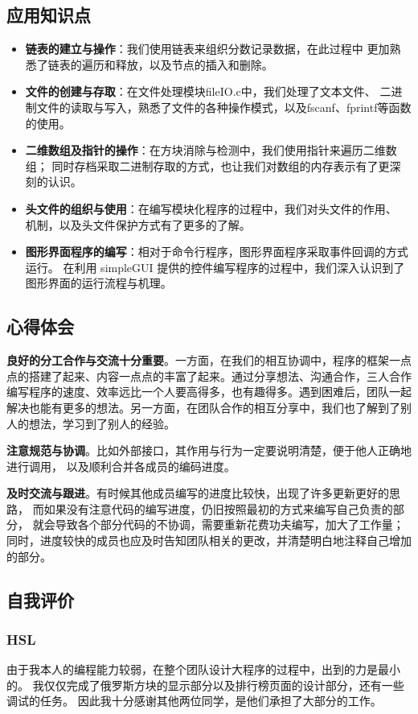 \documentclass{style/ucasproposal}
\begin{document}
\subsection{应用知识点}
\begin{itemize}
    \item \textbf{链表的建立与操作}：我们使用链表来组织分数记录数据，在此过程中
    更加熟悉了链表的遍历和释放，以及节点的插入和删除。
    \item \textbf{文件的创建与存取}：在文件处理模块fileIO.c中，我们处理了文本文件、
    二进制文件的读取与写入，熟悉了文件的各种操作模式，以及fscanf、fprintf等函数的使用。
    \item \textbf{二维数组及指针的操作}：在方块消除与检测中，我们使用指针来遍历二维数组；
    同时存档采取二进制存取的方式，也让我们对数组的内存表示有了更深刻的认识。
    \item \textbf{头文件的组织与使用}：在编写模块化程序的过程中，我们对头文件的作用、
    机制，以及头文件保护方式有了更多的了解。
    \item \textbf{图形界面程序的编写}：相对于命令行程序，图形界面程序采取事件回调的方式运行。
    在利用 simpleGUI 提供的控件编写程序的过程中，我们深入认识到了图形界面的运行流程与机理。
\end{itemize}


\subsection{心得体会}
\textbf{良好的分工合作与交流十分重要}。一方面，在我们的相互协调中，程序的框架一点点的搭建了起来、内容一点点的丰富了起来。通过分享想法、沟通合作，三人合作编写程序的速度、效率远比一个人要高得多，也有趣得多。遇到困难后，团队一起解决也能有更多的想法。另一方面，在团队合作的相互分享中，我们也了解到了别人的想法，学习到了别人的经验。

\textbf{注意规范与协调}。比如外部接口，其作用与行为一定要说明清楚，便于他人正确地进行调用，
以及顺利合并各成员的编码进度。

\textbf{及时交流与跟进}。有时候其他成员编写的进度比较快，出现了许多更新更好的思路，
而如果没有注意代码的编写进度，仍旧按照最初的方式来编写自己负责的部分，
就会导致各个部分代码的不协调，需要重新花费功夫编写，加大了工作量；
同时，进度较快的成员也应及时告知团队相关的更改，并清楚明白地注释自己增加的部分。

\subsection{自我评价}
\subsubsection{HSL}
由于我本人的编程能力较弱，在整个团队设计大程序的过程中，出到的力是最小的。
我仅仅完成了俄罗斯方块的显示部分以及排行榜页面的设计部分，还有一些调试的任务。
因此我十分感谢其他两位同学，是他们承担了大部分的工作。
\end{document}
